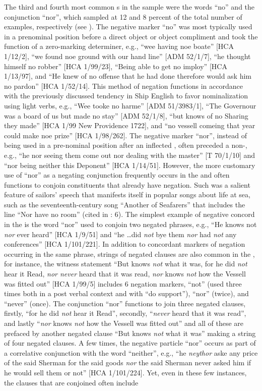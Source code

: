 The third and fourth most common s in the sample were the words “no” and the conjunction “nor”, which sampled at 12 and 8 percent of the total number of examples, respectively (see ). The negative marker “no” was most typically used in a prenominal position before a direct object or object compliment and took the function of a zero-marking determiner, e.g., “wee having noe boate” [HCA 1/12/2], “we found noe ground with our hand line” [ADM 52/1/7], “he thought himself no robber” [HCA 1/99/23], “Being able to get no imploy” [HCA 1/13/97], and “He knew of no offense that he had done therefore would ask him no pardon” [HCA 1/52/14]. This method of negation functions in accordance with the previously discussed tendency in Ship English to favor nominalization using light verbs, e.g., “Wee tooke no harme” [ADM 51/3983/1], “The Governour was a board of us but made no stay” [ADM 52/1/8], “but knows of no Sharing they made” [HCA 1/99 New Providence 1722], and “no vessell comeing that year could make noe prize” [HCA 1/98/262]. The negative marker “nor”,  instead of being used in a pre-nominal position after an inflected , often preceded a non-, e.g., “he nor seeing them come out nor dealing with the master” [T 70/1/10] and “nor being neither this Deponent” [HCA 1/14/51]. However, the more customary use of “nor” as a negating conjunction frequently occurs in the  and often functions to conjoin constituents that already have negation. Such  was a salient feature of sailors’ speech that manifests itself in popular songs about life at sea, such as the seventeenth-century song “Another of Seafarers” that includes the line “Nor have no room” (cited in \citealt{Palmer1986}: 6). The simplest example of negative concord in the  is the word “nor” used to conjoin two negated  phrases, e.g., “He knows not \textit{nor} ever heard” [HCA 1/9/51] and “he …did \textit{not} bye them \textit{nor} had \textit{not} any conferences” [HCA 1/101/221]. In addition to concordant markers of negation occurring in the same phrase, strings of negated clauses are also common in the , for instance, the witness statement “But knows \textit{not} what it was, for he did \textit{not} hear it Read, \textit{nor never} heard that it was read, \textit{nor} knows \textit{not} how the Vessell was fitted out” [HCA 1/99/5] includes 6 negation markers, “not” (used three times both in a post verbal context and with “do support”), “nor” (twice), and “never” (once). The conjunction “nor” functions to join three negated clauses, firstly, “for he did \textit{not} hear it Read”, secondly, “\textit{never} heard that it was read”, and lastly “\textit{nor} knows \textit{not} how the Vessell was fitted out” and all of these are prefaced by another negated clause “But knows \textit{not} what it was” making a string of four negated clauses. A few times, the negative particle “nor” occurs as part of a correlative conjunction with the word “neither”, e.g., “he \textit{neythor} aske any price of the said Sherman for the said goods \textit{nor} the said Sherman never asked him if he would sell them or not” [HCA 1/101/224]. Yet, even in these few instances, the clauses that are conjoined often include 